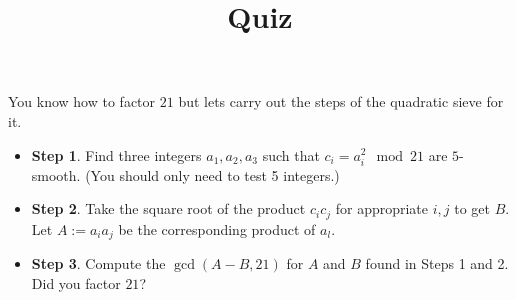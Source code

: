 \documentclass[12pt]{amsart}
\theoremstyle{definition}
\begin{document}
\title{Quiz}

\maketitle

You know how to factor $21$ but lets carry out the steps of the 
quadratic sieve for it. 
\begin{itemize}
	\item \textbf{Step 1}. Find three integers $a_1, a_2, a_3$ such that 
	$c_i = a_i^2 \mod 21$ are $5$-smooth. (You should only need to test 5 integers.)

	\item \textbf{Step 2}. Take the square root of the product $c_ic_j$ for 
		appropriate $i,j$ to get $B$. Let $A := a_ia_j$ be the
		corresponding product of $a_l$.  

	\item \textbf{Step 3}. Compute the $\operatorname{gcd}(A-B,21)$ 
	for $A$ and $B$ found in Steps 1 and 2. Did you factor $21$? 
\end{itemize}
	
\end{document}

